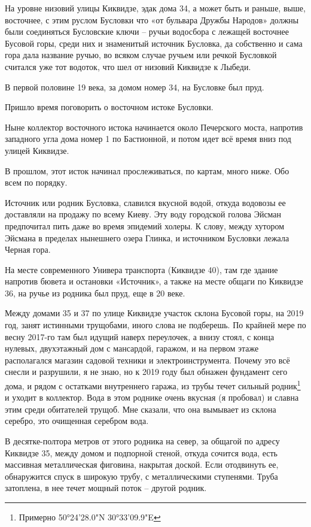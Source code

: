 На уровне низовий улицы Киквидзе, эдак дома 34, а может быть и раньше, выше, восточнее, с этим руслом Бусловки что «от бульвара Дружбы Народов» должны были соединяться Бусловские ключи – ручьи водосбора с лежащей восточнее Бусовой горы, среди них и знаменитый источник Бусловка, да собственно и сама гора дала название ручью, во всяком случае ручьем или речкой Бусловкой считался уже тот водоток, что шел от низовий Киквидзе к Лыбеди.

В первой половине 19 века, за домом номер 34, на Бусловке был пруд.

Пришло время поговорить о восточном истоке Бусловки.

Ныне коллектор восточного истока начинается около Печерского моста, напротив западного угла дома номер 1 по Бастионной, и потом идет всё время вниз под улицей Киквидзе. 

В прошлом, этот исток начинал прослеживаться, по картам, много ниже. Обо всем по порядку.

Источник или родник Бусловка, славился вкусной водой, откуда водовозы ее доставляли на продажу по всему Киеву. Эту воду городской голова Эйсман предпочитал пить даже во время эпидемий холеры. К слову, между хутором Эйсмана в пределах нынешнего озера Глинка, и источником Бусловки лежала Черная гора.

На месте современного Универа транспорта (Киквидзе 40), там где здание напротив бювета и остановки «Источник», а также на месте общаги по Киквидзе 36,  на ручье из родника был пруд, еще в 20 веке.

Между домами 35 и 37 по улице Киквидзе участок склона Бусовой горы, на 2019 год, занят истинными трущобами, иного слова не подберешь. По крайней мере по весну 2017-го там был идущий наверх переулочек, а внизу стоял, с конца нулевых, двухэтажный дом с мансардой, гаражом, и на первом этаже располагался магазин садовой техники и электроинструмента. Почему это всё снесли и разрушили, я не знаю, но к 2019 году был обнажен фундамент сего дома, и рядом с остатками внутреннего гаража, из трубы течет сильный родник\footnote{Примерно 50°24'28.0"N 30°33'09.9"E} и уходит в коллектор. Вода в этом роднике очень вкусная (я пробовал) и славна этим среди обитателей трущоб. Мне сказали, что она вымывает из склона серебро, это очищенная серебром вода.

В десятке-полтора метров от этого родника на север, за общагой по адресу Киквидзе 35, между домом и подпорной стеной, откуда сочится вода, есть массивная металлическая фиговина, накрытая доской. Если отодвинуть ее, обнаружится спуск в широкую трубу, с металлическими ступенями. Труба затоплена, в нее течет мощный поток – другой родник.

